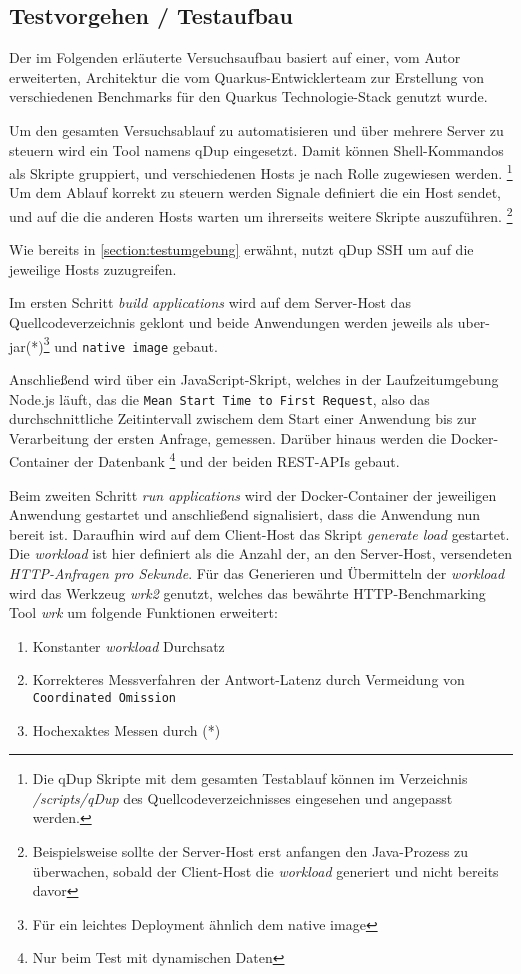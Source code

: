 \subsection{Testvorgehen / Testaufbau}
\label{section:vorgehen}
Der im Folgenden erläuterte Versuchsaufbau basiert auf einer, vom Autor erweiterten, Architektur die vom Quarkus-Entwicklerteam
zur Erstellung von verschiedenen Benchmarks für den Quarkus Technologie-Stack genutzt wurde.
\parencite{QuarkusBlog, QuarkusJohnaohara}

Um den gesamten Versuchsablauf zu automatisieren und über mehrere Server zu steuern wird ein Tool namens qDup eingesetzt.
Damit können Shell-Kommandos als Skripte gruppiert, und verschiedenen Hosts je nach Rolle zugewiesen werden.
\footnote{Die qDup Skripte mit dem gesamten Testablauf können im Verzeichnis \textit{/scripts/qDup} des Quellcodeverzeichnisses eingesehen und
  angepasst werden.}
Um dem Ablauf korrekt zu steuern werden Signale definiert die ein Host sendet, und auf die die anderen Hosts warten um ihrerseits
weitere Skripte auszuführen.
\footnote{Beispielsweise sollte der Server-Host erst anfangen den Java-Prozess zu überwachen, sobald der Client-Host die \textit{workload}
  generiert und nicht bereits davor}


Wie bereits in \ref{section:testumgebung} erwähnt, nutzt qDup SSH um auf die jeweilige Hosts zuzugreifen.

Im ersten Schritt \textit{build applications} wird auf dem Server-Host das Quellcodeverzeichnis geklont und beide Anwendungen werden jeweils
als \gls{uber-jar}(*)\footnote{Für ein leichtes Deployment ähnlich dem native image} und \verb|native image| gebaut.

Anschließend wird über ein JavaScript-Skript,
welches in der Laufzeitumgebung Node.js läuft, das die \verb|Mean Start Time to First Request|, also das durchschnittliche Zeitintervall zwischem dem Start einer Anwendung bis
zur Verarbeitung der ersten Anfrage, gemessen. Darüber hinaus werden die Docker-Container der Datenbank
\footnote{Nur beim Test mit dynamischen Daten} und der beiden REST-APIs gebaut.

Beim zweiten Schritt \textit{run applications} wird der Docker-Container der jeweiligen Anwendung gestartet und anschließend signalisiert,
dass die Anwendung nun bereit ist.
Daraufhin wird auf dem Client-Host das Skript \textit{generate load} gestartet.
Die \textit{workload} ist hier definiert als die Anzahl der, an den Server-Host, versendeten \textit{HTTP-Anfragen pro Sekunde}.
Für das Generieren und Übermitteln der \textit{workload} wird das Werkzeug \textit{wrk2} genutzt, welches das
bewährte HTTP-Benchmarking Tool \textit{wrk} um folgende Funktionen erweitert:
\begin{enumerate}
  \item Konstanter \textit{workload} Durchsatz
  \item Korrekteres Messverfahren der Antwort-Latenz durch Vermeidung von \verb|Coordinated Omission|
  \item Hochexaktes Messen durch (*)
\end{enumerate}\parencite{Wrk2, Wrk}

